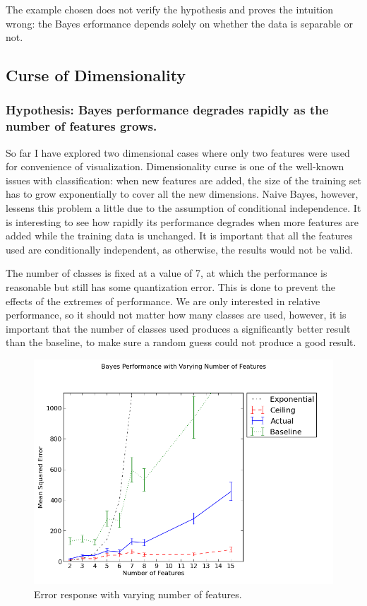 \documentclass[12pt,notitlepage,twoside]{scrreprt}
\begin{document}
The example chosen does not verify the hypothesis and proves the intuition wrong: the
Bayes erformance depends solely on whether the data is separable or not.

\subsection{Curse of Dimensionality}
\subsubsection*{Hypothesis: Bayes performance degrades rapidly as the number of features grows.}
So far I have explored two dimensional cases where only two features were used for
convenience of visualization. Dimensionality curse is one of the well-known issues with
classification: when new features are added, the size of the training set has to grow
exponentially to cover all the new dimensions. Naive Bayes, however, lessens this problem
a little due to the assumption of conditional independence. It is interesting to see how
rapidly its performance degrades when more features are added while the training data is
unchanged. It is important that all the features used are conditionally independent, as
otherwise, the results would not be valid. 

The number of classes is fixed at a value of 7, at which the performance is reasonable but
still has some quantization error. This is done to prevent the effects of the extremes of
performance. We are only interested in relative performance, so it should not matter how
many classes are used, however, it is important that the number of classes used produces a
significantly better result than the baseline, to make sure a random guess could not
produce a good result.

\begin{figure}[h!]
  \centering
  \includegraphics[width=\linewidth]{figs/feats.png}
  \caption{Error response with varying number of features.\label{feats}}
\end{figure}
\end{document}
